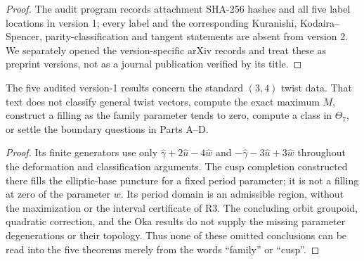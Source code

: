\begin{proof}
The audit program records attachment SHA-256 hashes and all five
label locations in version 1; every label and the corresponding
Kuranishi, Kodaira--Spencer, parity-classification and tangent
statements are absent from version 2.  We separately opened the
version-specific arXiv records and treat these as preprint
versions, not as a journal publication verified by its title.
\end{proof}

\begin{proposition}
The five audited version-1 results concern the standard
$(3,4)$ twist data.  That text does not classify general twist
vectors, compute the exact maximum $M$, construct a filling as
the family parameter tends to zero, compute a class in
$\Theta_7$, or settle the boundary questions in Parts A--D.
\end{proposition}
\begin{proof}
Its finite generators use only
$\widehat\gamma+2\widehat u-4\widehat w$ and
$-\widehat\gamma-3\widehat u+3\widehat w$ throughout the
deformation and classification arguments.  The cusp completion
constructed there fills the elliptic-base puncture for a fixed
period parameter; it is not a filling at zero of the parameter
$w$.  Its period domain is an admissible region, without the
maximization or the interval certificate of R3.  The concluding
orbit groupoid, quadratic correction, and the Oka results do not
supply the missing parameter degenerations or their topology.
Thus none of these omitted conclusions can be read into the
five theorems merely from the words ``family'' or ``cusp''.
\end{proof}


